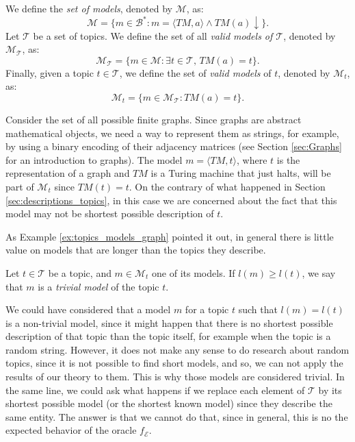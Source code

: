\begin{definition}
\label{def:descriptions_model}
We define the \emph{set of models}, denoted by $\mathcal{M}$, as:
\[
\mathcal{M} = \{ m \in \mathcal{B}^\ast : m = \langle TM,a \rangle \wedge TM(a) \downarrow \}.
\]
Let $\mathcal{T}$ be a set of topics. We define the set of all \emph{valid models of $\mathcal{T}$}, denoted by $\mathcal{M}_{\mathcal{T}}$, as:
\[
\mathcal{M}_{\mathcal{T}} = \{ m \in \mathcal{M} : \exists t \in \mathcal{T},\, TM(a) = t \}.
\]
Finally, given a topic $t \in \mathcal{T}$, we define the set of \emph{valid models} of $t$, denoted by $\mathcal{M}_t$, as:
\[
\mathcal{M}_t = \{ m \in \mathcal{M}_{\mathcal{T}} : TM(a) = t \}.
\]
\end{definition}

\begin{example}
\label{ex:topics_models_graph}
Consider the set of all possible finite graphs. Since graphs are abstract mathematical objects, we need a way to represent them as strings, for example, by using a binary encoding of their adjacency matrices (see Section \ref{sec:Graphs} for an introduction to graphs). The model $m = \langle TM, t \rangle$, where $t$ is the representation of a graph and $TM$ is a Turing machine that just halts, will be part of $\mathcal{M}_t$ since $TM(t) = t$. On the contrary of what happened in Section \ref{sec:descriptions_topics}, in this case we are concerned about the fact that this model may not be shortest possible description of $t$.
\end{example}

As Example \ref{ex:topics_models_graph} pointed it out, in general there is little value on models that are longer than the topics they describe.

\begin{definition}
\label{def:trivial_model}
Let $t \in \mathcal{T}$ be a topic, and $m \in \mathcal{M}_t$ one of its models. If $l(m) \geq l(t)$, we say that $m$ is a \emph{trivial model} of the topic $t$.
\end{definition}

We could have considered that a model $m$ for a topic $t$ such that $l(m) = l(t)$ is a non-trivial model, since it might happen that there is no shortest possible description of that topic than the topic itself, for example when the topic is a random string. However, it does not make any sense to do research about random topics, since it is not possible to find short models, and so, we can not apply the results of our theory to them. This is why those models are considered trivial. In the same line, we could ask what happens if we replace each element of $\mathcal{T}$ by its shortest possible model (or the shortest known model) since they describe the same entity. The answer is that we cannot do that, since in general, this is no the expected behavior of the oracle $f_\mathcal{E}$.

